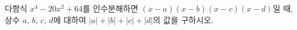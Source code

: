 다항식 $x^4-20x^2+64$를 인수분해하면 $(x-a)(x-b)(x-c)(x-d)$일 때, 상수 $a$, $b$, $c$, $d$에 대하여 $|a|+|b|+|c|+|d|$의 값을 구하시오.
